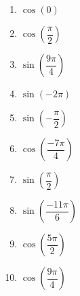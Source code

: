 \documentclass[11pt]{article}
\begin{document}
\begin{exercice}

\begin{multicols}{2}
\begin{enumerate}[itemsep=1em]
	\item \begin{minipage}[t]{\linewidth} $\cos\left(0\right)$ \end{minipage}
	\item \begin{minipage}[t]{\linewidth} $\cos\left(\dfrac{\pi}{2}\right)$ \end{minipage}
	\item \begin{minipage}[t]{\linewidth} $\sin\left(\dfrac{9\pi}{4}\right)$ \end{minipage}
	\item \begin{minipage}[t]{\linewidth} $\sin\left(-2\pi\right)$ \end{minipage}
	\item \begin{minipage}[t]{\linewidth} $\sin\left(-\dfrac{\pi}{2}\right)$ \end{minipage}
	\item \begin{minipage}[t]{\linewidth} $\cos\left(\dfrac{-7\pi}{4}\right)$ \end{minipage}
	\item \begin{minipage}[t]{\linewidth} $\sin\left(\dfrac{\pi}{2}\right)$ \end{minipage}
	\item \begin{minipage}[t]{\linewidth} $\sin\left(\dfrac{-11\pi}{6}\right)$ \end{minipage}
	\item \begin{minipage}[t]{\linewidth} $\cos\left(\dfrac{5\pi}{2}\right)$ \end{minipage}
	\item \begin{minipage}[t]{\linewidth} $\cos\left(\dfrac{9\pi}{4}\right)$ \end{minipage}
\end{enumerate}
\end{multicols}
\end{exercice}
\end{document}
